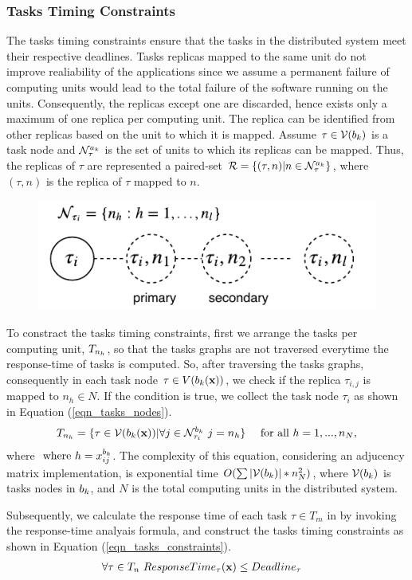 \subsubsection{Tasks Timing Constraints}
The tasks timing constraints ensure that the tasks in the distributed system meet their respective deadlines. Tasks replicas mapped to the same unit do not improve realiability of the applications since we assume a permanent failure of computing units would lead to the total failure of the software running on the units. Consequently, the replicas except one are discarded, hence exists only a maximum of one replica per computing unit. The replica can be identified from other replicas based on the unit to which it is mapped. Assume $\tau\in \mathcal{V}(b_{k})$ is a task node and $\sss{\mathcal{N}}[k][\tau]$ is the set of units to which its replicas can be mapped. Thus, the replicas of $\tau$ are represented a paired-set $\mathcal{R}=\{(\tau,n)|n\in\sss{\mathcal{N}}[k][\tau]\}$, where $(\tau,n)$ is the replica of $\tau$ mapped to $n$.
\begin{figure}[h!]
	\centering
	\includegraphics[width=0.6\linewidth]{img/task_replication}
\end{figure}

To constract the tasks timing constraints, first we arrange the tasks per computing unit, $\ssb{T}[n_h]$, so that the tasks graphs are not traversed everytime the response-time of tasks is computed. So, after traversing the tasks graphs, consequently in each task node $\tau\in V(b_{k}(\textbf{x}))$, we check if the replica $\tau_{i,j}$ is mapped to $n_h\in N$. If the condition is true, we collect the task node $\tau_i$ as shown in Equation (\ref{eqn_tasks_nodes}). 
\begin{align}
\label{eqn_tasks_nodes}
T_{n_h}&=\{\tau\in \mathcal{V}(\at(\x)) | \forall j\in\sss{\mathcal{N}}[k][\tau_i][b]\ j=n_h\} & \mbox{ for all } h=1,...,n_N,
\end{align}
where $\mbox{ where }h=x^{b_k}_{ij}$. The complexity of this equation, considering an adjucency matrix implementation, is exponential time $O(\sum{|\mathcal{V}(b_{k})|*n_N^2})$, where $\mathcal{V}(b_{k})$ is tasks nodes in $b_{k}$, and $N$ is the total computing units in the distributed system. 

Subsequently, we calculate the response time of each task $\tau \in T_{m}$ in \ttx by invoking the response-time analyais formula, and construct the tasks timing constraints as shown in Equation (\ref{eqn_tasks_constraints}).
\begin{align}
\label{eqn_tasks_constraints}
\forall \tau\in T_{n} \ ResponseTime_\tau(\textbf{x})&\leq Deadline_\tau
\end{align}


